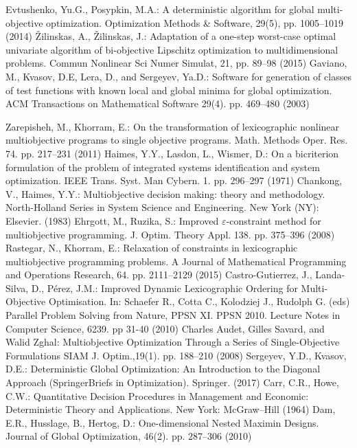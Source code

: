 \documentclass[smallextended]{svjour3}       %
\begin{document}
\begin{thebibliography}{}
 Evtushenko, Yu.G., Posypkin, M.A.: A deterministic algorithm for global multi-objective optimization. Optimization Methods \& Software, 29(5), pp. 1005--1019 (2014)
 {\v Z}ilinskas, A., {\v Z}ilinskas, J.: Adaptation of a one-step worst-case optimal univariate algorithm of bi-objective Lipschitz optimization to multidimensional problems. Commun Nonlinear Sci Numer Simulat, 21, pp. 89--98 (2015)
 Gaviano, M., Kvasov, D.E, Lera, D., and Sergeyev, Ya.D.: Software for generation of classes of test functions with known local and global minima for global optimization. ACM Transactions on Mathematical Software 29(4). pp. 469--480 (2003)


 Zarepisheh, M., Khorram, E.: On the transformation of lexicographic nonlinear multiobjective  programs to single objective programs. Math. Methods Oper. Res. 74. pp. 217--231 (2011)
 Haimes, Y.Y., Lasdon, L., Wismer, D.: On a bicriterion formulation of the problem of integrated systems identification and system optimization. IEEE Trans. Syst. Man Cybern. 1. pp. 296--297 (1971)
 Chankong, V., Haimes, Y.Y.: Multiobjective decision making: theory and methodology. North-Holland Series in System Science and Engineering. New York (NY): Elsevier. (1983)
 Ehrgott, M., Ruzika, S.: Improved $\varepsilon$-constraint method for multiobjective programming. J. Optim. Theory Appl. 138. pp. 375--396 (2008)
 Rastegar, N., Khorram, E.: Relaxation of constraints in lexicographic multiobjective programming problems. A Journal of Mathematical Programming and Operations Research, 64. pp. 2111--2129 (2015)
 Castro-Gutierrez, J., Landa-Silva, D., Pérez, J.M.: Improved Dynamic Lexicographic Ordering for Multi-Objective Optimisation. In: Schaefer R., Cotta C., Kolodziej J., Rudolph G. (eds) Parallel Problem Solving from Nature, PPSN XI. PPSN 2010. Lecture Notes in Computer Science, 6239. pp 31-40 (2010) 
 Charles Audet, Gilles Savard, and Walid Zghal: Multiobjective Optimization Through a Series of Single-Objective Formulations SIAM J. Optim.,19(1). pp. 188--210 (2008)
 Sergeyev, Y.D., Kvasov, D.E.: Deterministic Global Optimization: An Introduction to the Diagonal Approach (SpringerBriefs in Optimization). Springer. (2017)
 Carr, C.R., Howe, C.W.: Quantitative Decision Procedures in Management and Economic: Deterministic Theory and Applications. New York: McGraw–Hill (1964)
 Dam, E.R., Husslage, B., Hertog, D.: One-dimensional Nested Maximin Designs. Journal of Global Optimization, 46(2). pp. 287--306 (2010)

\end{thebibliography}
\end{document}
